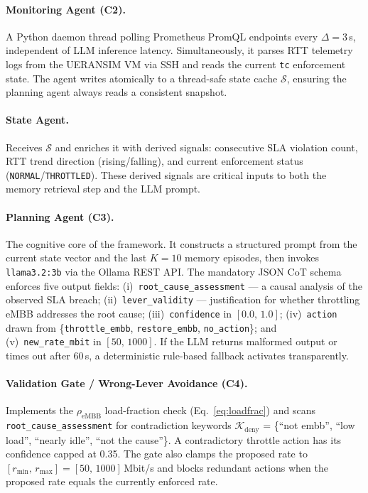 \documentclass[12pt]{article}
\begin{document}
\paragraph{Monitoring Agent (C2).}
A Python daemon thread polling Prometheus PromQL endpoints every
$\Delta = 3$\,s, independent of LLM inference latency. Simultaneously,
it parses RTT telemetry logs from the UERANSIM VM via SSH and reads the
current \texttt{tc} enforcement state. The agent writes atomically to a
thread-safe state cache $\mathcal{S}$, ensuring the planning agent always
reads a consistent snapshot.

\paragraph{State Agent.}
Receives $\mathcal{S}$ and enriches it with derived signals: consecutive
SLA violation count, RTT trend direction (rising/falling), and current
enforcement status (\texttt{NORMAL}\slash\texttt{THROTTLED}). These derived
signals are critical inputs to both the memory retrieval step and the LLM
prompt.

\paragraph{Planning Agent (C3).}
The cognitive core of the framework. It constructs a structured prompt
from the current state vector and the last $K=10$ memory episodes, then
invokes \texttt{llama3.2:3b} via the Ollama REST API. The mandatory JSON
CoT schema enforces five output fields: (i)~\texttt{root\_cause\_assessment}
--- a causal analysis of the observed SLA breach; (ii)~\texttt{lever\_validity}
--- justification for whether throttling eMBB addresses the root cause;
(iii)~\texttt{confidence} in $[0.0,\, 1.0]$; (iv)~\texttt{action} drawn
from \{\texttt{throttle\_embb}, \texttt{restore\_embb}, \texttt{no\_action}\};
and (v)~\texttt{new\_rate\_mbit} in $[50,\,1000]$. If the LLM returns
malformed output or times out after 60\,s, a deterministic rule-based
fallback activates transparently.

\paragraph{Validation Gate / Wrong-Lever Avoidance (C4).}
Implements the $\rho_\text{eMBB}$ load-fraction check
(Eq.~\ref{eq:loadfrac}) and scans \texttt{root\_cause\_assessment} for
contradiction keywords $\mathcal{K}_\text{deny}$ = \{``not embb'', ``low
load'', ``nearly idle'', ``not the cause''\}. A contradictory throttle
action has its confidence capped at 0.35. The gate also clamps the
proposed rate to $[r_\text{min},\,r_\text{max}] = [50,\,1000]$\,Mbit/s
and blocks redundant actions when the proposed rate equals the currently
enforced rate.
\end{document}
